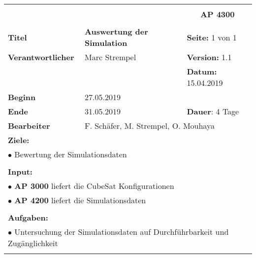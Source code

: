 \clearpage
\begin{table}[!h]
 \begin{center}
  \begin{tabular}{|p{35mm}||p{55mm}|p{50mm}||p{40mm}|}
   \hline
   \multicolumn{3}{|l||}{\textbf{}} & \multicolumn{1}{c|}{}\\
   \multicolumn{3}{|l||}{\textbf{}} & \multicolumn{1}{c|}{\textbf{AP 4300}}\\
   \multicolumn{3}{|l||}{\textbf{}} & \multicolumn{1}{c|}{}\\
   \hline\hline
   \textbf{Titel} & \multicolumn{2}{p{7cm}||}{\textbf{Auswertung der Simulation}} & \textbf{Seite:} 1 von 1\\
   \hline
   \textbf{Verantwortlicher} & \multicolumn{2}{l||}{Marc Strempel} & \textbf{Version:} 1.1\\
   \hline
   \multicolumn{3}{|l||}{} & \textbf{Datum:} 15.04.2019\\
   \hline\hline
   \textbf{Beginn} & \multicolumn{2}{l||}{27.05.2019} & \\
   \hline
   \textbf{Ende} & \multicolumn{2}{l||}{31.05.2019} & \textbf{Dauer}: 4 Tage\\
   \hline\hline
   \textbf{Bearbeiter} & \multicolumn{3}{l|}{F. Schäfer, M. Strempel, O. Mouhaya}\\
   \hline\hline
   \multicolumn{4}{|p{150mm}|}{\textbf{Ziele:}}\\
   \multicolumn{4}{|p{150mm}|}{$\bullet$ Bewertung der Simulationsdaten}\\
   \multicolumn{4}{|p{150mm}|}{}\\
   \multicolumn{4}{|p{150mm}|}{\textbf{Input:}}\\
   \multicolumn{4}{|p{150mm}|}{$\bullet$ \textbf{AP 3000} liefert die CubeSat Konfigurationen}\\
   \multicolumn{4}{|p{150mm}|}{$\bullet$ \textbf{AP 4200} liefert die Simulationsdaten}\\
   \multicolumn{4}{|p{150mm}|}{}\\
   \multicolumn{4}{|p{150mm}|}{\textbf{Aufgaben:}}\\
   \multicolumn{4}{|p{150mm}|}{$\bullet$ Untersuchung der Simulationsdaten auf Durchführbarkeit und Zugänglichkeit}\\
   \multicolumn{4}{|p{150mm}|}{}\\
   \hline
  \end{tabular}
 \end{center}
\end{table}

